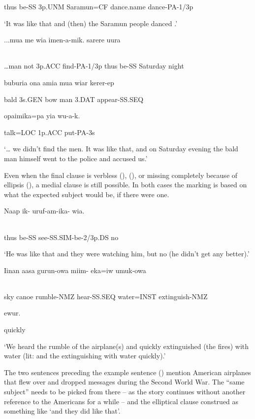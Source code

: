thus  be-SS  3p.UNM  Saramun=CF  dance.name  dance-PA-1/3p

`It was like that and (then) the Saramun people danced .'

\ea%
\label{ex:x1501}
\gll ...mua  me  wia  imen-a-mik.    sarere  uura  \\
      \\
\glt
\z

{\dots}man  not  3p.ACC  find-PA-1/3p  thus  be-SS  Saturday  night

buburia  ona  amia  mua  wiar  kerer-ep

bald  3s.GEN  bow  man  3.DAT  appear-SS.SEQ  

opaimika=pa  yia  wu-a-k.

talk=LOC  1p.ACC  put-PA-3s

`{\dots} we didn't find the men. It was like that, and on Saturday evening the bald man himself went to the police and accused us.'

Even when the final clause is verbless (), (), or missing completely because of ellipsis (), a medial clause is still possible. In both cases the  marking is based on what the expected subject would be, if there were one. 

\ea%
\label{ex:x1497}
\gll Naap  ik-  uruf-am-ika-  wia. \\
      \\
\glt
\z

thus  be-SS  see-SS.SIM-be-2/3p.DS  no

`He was like that and they were watching him, but no (he didn't get any better).'

\ea%
\label{ex:x1498}
\gll Iinan  aasa  gurun-owa  miim-  eka=iw  umuk-owa  \\
      \\
\glt
\z

sky  canoe  rumble-NMZ  hear-SS.SEQ  water=INST  extinguish-NMZ

ewur.

quickly

`We heard the rumble of the airplane(s) and quickly extinguished (the fires) with water (lit: and the extinguishing with water quickly).'

The two sentences preceding the example sentence () mention American airplanes that flew over and dropped messages during the Second World War. The ``same subject'' needs to be picked from there -- as the story continues without another reference to the Americans for a while -- and the elliptical clause construed as something like  `and they did like that'.

